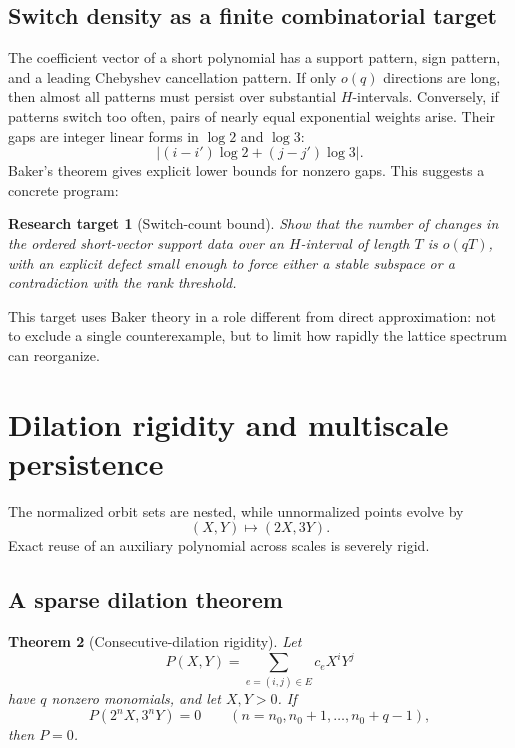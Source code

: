 \documentclass[11pt,oneside]{article}
\newtheorem{theorem}{Theorem}[section]
\newtheorem{target}[theorem]{Research target}
\theoremstyle{definition}
\theoremstyle{remark}
\begin{document}
\subsection{Switch density as a finite combinatorial target}

The coefficient vector of a short polynomial has a support pattern, sign pattern, and a
leading Chebyshev cancellation pattern.  If only $o(q)$ directions are long, then almost all
patterns must persist over substantial $H$-intervals.  Conversely, if patterns switch too
often, pairs of nearly equal exponential weights arise.  Their gaps are integer linear forms
in $\log2$ and $\log3$:
\[
 |(i-i')\log2+(j-j')\log3|.
\]
Baker's theorem gives explicit lower bounds for nonzero gaps.  This suggests a concrete
program:

\begin{target}[Switch-count bound]
\label{target:switch-count}
Show that the number of changes in the ordered short-vector support data over an $H$-interval
of length $T$ is $o(qT)$, with an explicit defect small enough to force either a stable
subspace or a contradiction with the rank threshold.
\end{target}

This target uses Baker theory in a role different from direct approximation: not to exclude a
single counterexample, but to limit how rapidly the lattice spectrum can reorganize.

\section{Dilation rigidity and multiscale persistence}
\label{sec:dilation-rigidity}

The normalized orbit sets are nested, while unnormalized points evolve by
\[
 (X,Y)\longmapsto(2X,3Y).
\]
Exact reuse of an auxiliary polynomial across scales is severely rigid.

\subsection{A sparse dilation theorem}

\begin{theorem}[Consecutive-dilation rigidity]
\label{thm:dilation-rigidity}
Let
\[
 P(X,Y)=\sum_{e=(i,j)\in E}c_eX^iY^j
\]
have $q$ nonzero monomials, and let $X,Y>0$.  If
\begin{equation}
 P(2^nX,3^nY)=0
 \qquad(n=n_0,n_0+1,\ldots,n_0+q-1),
 \label{eq:q-dilations}
\end{equation}
then $P=0$.
\end{theorem}
\end{document}
